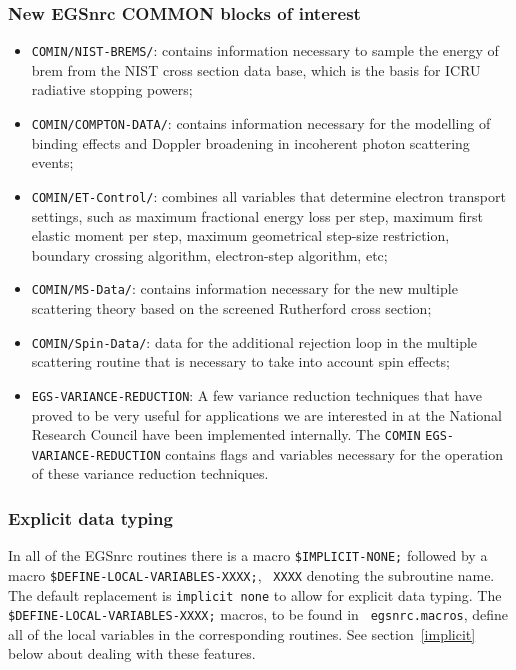 \subsubsection{New EGSnrc COMMON blocks of interest}

\begin{itemize}
\item
{\tt COMIN/NIST-BREMS/}: contains information necessary
to sample the energy of brem from the NIST
cross section data base, which is the basis for ICRU radiative
stopping powers;
 

\item
{\tt COMIN/COMPTON-DATA/}: contains information necessary
for the modelling of binding effects and Doppler broadening in
incoherent photon scattering events;

\item
{\tt COMIN/ET-Control/}: combines all variables that determine
electron transport settings, such as maximum fractional
energy loss per step, maximum first elastic moment per step,
maximum geometrical step-size restriction, boundary crossing
algorithm, electron-step algorithm, etc;

\item
{\tt COMIN/MS-Data/}: contains information necessary for
the new multiple scattering theory based on the screened
Rutherford cross section;

\item
{\tt COMIN/Spin-Data/}: data for the additional rejection
loop in the multiple scattering routine that is necessary
to take into account spin effects;

\item
{\tt EGS-VARIANCE-REDUCTION}: A few variance reduction
techniques that have proved to be very useful for applications
we are interested in at the National Research Council
have been implemented internally. The {\tt COMIN}
{\tt EGS-VARIANCE-REDUCTION} contains flags and
variables necessary for the operation of these variance
reduction techniques.
\end{itemize}

\subsubsection{Explicit data typing}

\label{types}
In all of the EGSnrc routines there is a macro {\tt \$IMPLICIT-NONE;}
followed by a macro {\tt \$DEFINE-LOCAL-VARIABLES-XXXX;}, {\tt
XXXX} denoting the subroutine name. The default replacement is
{\tt implicit none} to allow for explicit data typing.  The {\tt
\$DEFINE-LOCAL-VARIABLES-XXXX;} macros, to be found in {\tt
egsnrc.macros}, define all of the local variables in the corresponding
routines. See section~\ref{implicit} below about dealing with these features.
 

